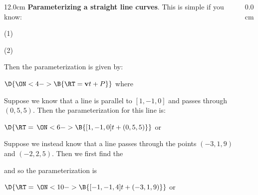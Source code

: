 \begin{frame}
{}
\scriptsize
\begin{columns}
\begin{column}{12.0cm}
{\bf Parameterizing a straight line curves}.  This is simple if you know: 

\vspace{0.2cm}

(1)  

\vspace{0.1cm}

(2) 

\vspace{0.4cm}

Then the parameterization is given by:

\vspace{0.2cm}

\begin{center}
	$\D{\ON<4->{\B{\RT = {\bf v} t + P}}}$ \quad where \quad 
	\ON<5->{\B{$t \in \RE$}}
\end{center}

\EX Suppose we know that a line is parallel to $[1,-1,0]$ and passes through $(0,5,5)$.  Then the parameterization for this line is:

\begin{center}
	$\D{\RT = \, 
	\ON<6->{\B{[1,-1,0] t + (0,5,5)}}}$ \quad or \quad 
	\ON<7->{\B{$\D{\RT = \, [t,-t+5,5]}$ \quad $t \in \RE$}}
\end{center}

\vspace{0.2cm}

\EX Suppose we instead know that a line passes through the points $(-3,1,9)$ and $(-2,2,5)$.  Then we first find the  

\begin{center}
\end{center}

and so the parameterization is

\begin{center}
	$\D{\RT = \, 
	\ON<10->{\B{[-1,-1,4] t + (-3,1,9)}}}$ \quad or \quad 
	\ON<11->{\B{$\D{\RT = \, [-t-3,-t+1,4t+9]}$ \quad $t \in \RE$}}
\end{center}

\end{column}
\begin{column}{0.0cm}\end{column}
\end{columns}
\end{frame}

